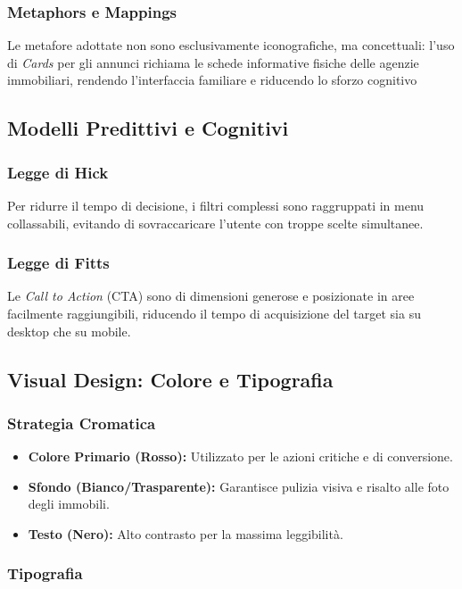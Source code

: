 \documentclass{article}
\begin{document}
\subsubsection{Metaphors e Mappings}
Le metafore adottate non sono esclusivamente iconografiche, ma concettuali: l'uso di \textit{Cards} per gli annunci richiama le schede informative fisiche delle agenzie immobiliari, rendendo l'interfaccia familiare e riducendo lo sforzo cognitivo

\subsection{Modelli Predittivi e Cognitivi}

\subsubsection{Legge di Hick}
Per ridurre il tempo di decisione, i filtri complessi sono raggruppati in menu collassabili, evitando di sovraccaricare l'utente con troppe scelte simultanee.

\subsubsection{Legge di Fitts}
Le \textit{Call to Action} (CTA) sono di dimensioni generose e posizionate in aree facilmente raggiungibili, riducendo il tempo di acquisizione del target sia su desktop che su mobile.

\subsection{Visual Design: Colore e Tipografia}

\subsubsection{Strategia Cromatica}
\begin{itemize}
    \item \textbf{Colore Primario (Rosso):} Utilizzato per le azioni critiche e di conversione.
    \item \textbf{Sfondo (Bianco/Trasparente):} Garantisce pulizia visiva e risalto alle foto degli immobili.
    \item \textbf{Testo (Nero):} Alto contrasto per la massima leggibilità.
\end{itemize}

\subsubsection{Tipografia}
\end{document}
